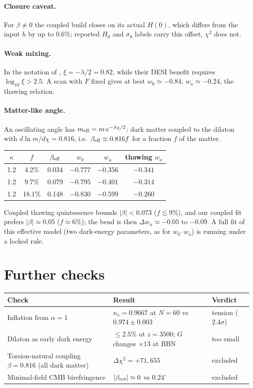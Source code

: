 \documentclass[11pt]{article}
\begin{document}
\paragraph{Closure caveat.} For $\beta\ne0$ the coupled build closes on its actual $H(0)$, which differs from the input
$h$ by up to $0.6\%$; reported $H_0$ and $\sigma_8$ labels carry this offset, $\chi^2$ does not.
\paragraph{Weak mixing.} In the notation of \cite{ramos2026}, $\xi=-\lambda/2=0.82$, while their DESI benefit requires
$\log_{10}\xi>2.5$. A scan with $F$ fixed gives at best $w_0\simeq-0.84$, $w_a\simeq-0.24$, the thawing relation.
\paragraph{Matter-like angle.} An oscillating angle has $m_{\rm eff}=m\,e^{-\lambda\chi/2}$: dark matter coupled to the
dilaton with $d\ln m/d\chi=0.816$, i.e.\ $\beta_{\rm eff}\simeq0.816f$ for a fraction $f$ of the matter.
\begin{center}\small
\begin{tabular}{cccccc}
\toprule
$\kappa$ & $f$ & $\beta_{\rm eff}$ & $w_0$ & $w_a$ & thawing $w_a$ \\
\midrule
1.2 & 4.2\% & 0.034 & $-0.777$ & $-0.356$ & $-0.341$\\
1.2 & 9.7\% & 0.079 & $-0.795$ & $-0.401$ & $-0.314$\\
1.2 & 18.1\% & 0.148 & $-0.830$ & $-0.599$ & $-0.260$\\
\bottomrule
\end{tabular}
\end{center}
Coupled thawing quintessence bounds $|\beta|<0.073$ \cite{babu2026} ($f\lesssim9\%$), and our coupled fit prefers
$|\beta|\simeq0.05$ ($f\simeq6\%$); the bend is then $\Delta w_a\simeq-0.05$ to $-0.09$. A full fit of this effective
model (two dark-energy parameters, as for $w_0$--$w_a$) is running under a locked rule.

\section{Further checks}
\begin{center}\small
\begin{tabular}{p{}p{}p{}}
\toprule
Check & Result & Verdict\\
\midrule
Inflation from $\alpha=1$ & $n_s=0.9667$ at $N=60$ vs $0.974\pm0.003$ \cite{act2025} & tension ($2.4\sigma$)\\
Dilaton as early dark energy & $\le2.5\%$ at $z=3500$; $G$ changes $\times13$ at BBN & too small\\
Torsion-natural coupling $\beta=0.816$ (all dark matter) & $\Delta\chi^2=+71{,}655$ & excluded\\
Minimal-field CMB birefringence & $|\beta_{\rm rot}|\approx0$ vs $0.24^\circ$ & excluded\\
\bottomrule
\end{tabular}
\end{center}
\end{document}

